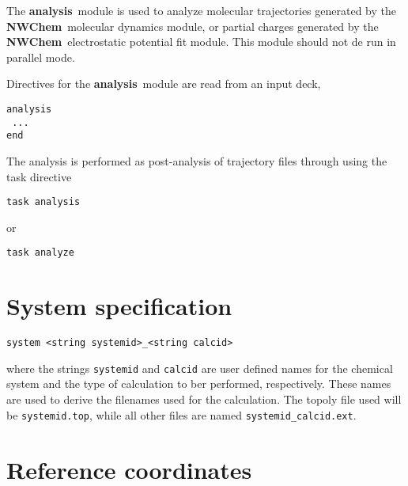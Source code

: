 %
%
\label{sec:analysis}
\def\bmu{\mbox{\boldmath $\mu$}}
\def\bE{\mbox{\bf E}}
\def\br{\mbox{\bf r}}
\def\tT{\tilde{T}}
\def\t{\tilde{1}}
\def\ip{i\prime}
\def\jp{j\prime}
\def\ipp{i\prime\prime}
\def\jpp{j\prime\prime}
\def\etal{{\sl et al.}}
\def\nwchem{{\bf NWChem}}
\def\nwargos{{\bf nwargos}}
\def\nwtop{{\bf nwtop}}
\def\nwrst{{\bf nwrst}}
\def\nwsgm{{\bf nwsgm}}
\def\esp{{\bf esp}}
\def\md{{\bf md}}
\def\prepare{{\bf prepare}}
\def\analysis{{\bf analysis}}
\def\argos{{\bf ARGOS}}
\def\amber{{\bf AMBER}}
\def\charmm{{\bf CHARMM}}
\def\discover{{\bf DISCOVER}}
\def\povray{{\bf povray}}
\def\gopenmol{{\bf gOpenMol}}
\def\ecce{{\bf ecce}}

The \analysis\ module is used to analyze molecular trajectories generated
by the \nwchem\ molecular dynamics module, or partial charges generated
by the \nwchem\ electrostatic potential fit module. This module should
not de run in parallel mode.

Directives for the \analysis\ module are read from an input deck,

\begin{verbatim}
analysis
 ...
end
\end{verbatim}

The analysis is performed  as post-analysis of trajectory files through 
using the {\rm task} directive

\begin{verbatim}
task analysis
\end{verbatim}
or
\begin{verbatim}
task analyze
\end{verbatim}

\section{System specification}

\begin{verbatim}
system <string systemid>_<string calcid>
\end{verbatim}

where the strings \verb+systemid+ and \verb+calcid+ are user defined names
for the chemical system and the type of calculation to ber performed, 
respectively. These names are used to derive the filenames used for the
calculation. The topoly file used will be \verb+systemid.top+, while all
other files are named \verb+systemid_calcid.ext+.

\section{Reference coordinates}

